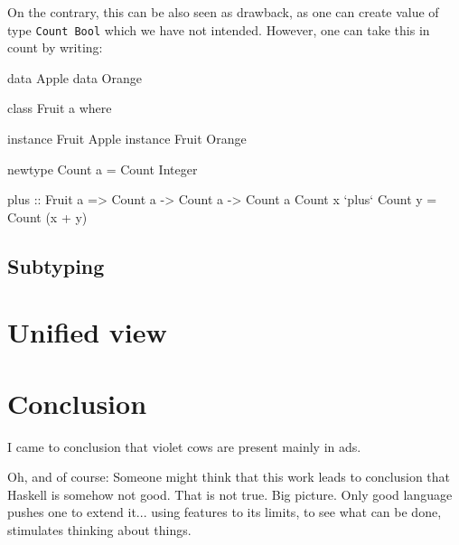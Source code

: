 \documentclass[11pt,oneside,draft]{fithesis2}
\begin{document}
On the contrary, this can be also seen as drawback, as one can create value
of type \texttt{Count Bool} which we have not intended. However,
one can take this in count by writing:
\begin{code}
data Apple
data Orange

class Fruit a where

instance Fruit Apple
instance Fruit Orange

newtype Count a = Count Integer

plus :: Fruit a => Count a -> Count a -> Count a
Count x `plus` Count y = Count (x + y)
\end{code}

%

\section{Subtyping}

\chapter{Unified view}


\chapter{Conclusion}

I came to conclusion that violet cows are present mainly in ads.

Oh, and of course:
Someone might think that this work leads to conclusion that Haskell is somehow not good.
That is not true. Big picture. Only good language pushes one to extend it... using features
to its limits, to see what can be done, stimulates thinking about things.

%


\end{document}
